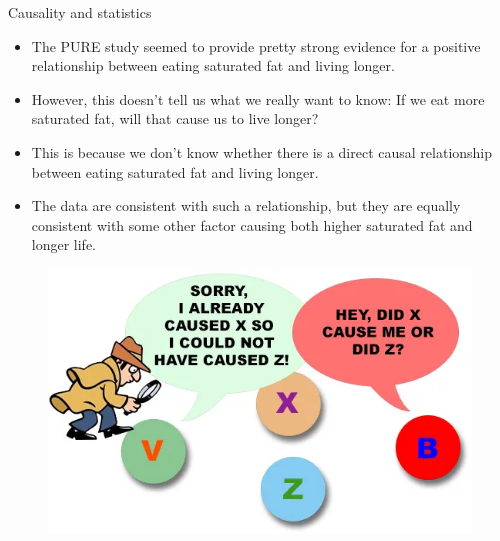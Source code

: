 \documentclass[handout]{beamer}
\begin{document}
\begin{frame}{Causality and statistics}

\scriptsize{
\begin{itemize}
\item The PURE study seemed to provide pretty strong evidence for a positive relationship between eating saturated fat and living longer.
\item However, this doesn't tell us what we really want to know: If we eat more saturated fat, will that cause us to live longer?
\item This is because we don't know whether there is a direct causal relationship between eating saturated fat and living longer. 
\item The data are consistent with such a relationship, but they are equally consistent with some other factor causing both higher saturated fat and longer life.

\end{itemize}

\begin{figure}[h!]
	\centering
	\includegraphics[scale=0.4]{pics/causality.png}
\end{figure}

}
 
\end{frame}
\end{document}
